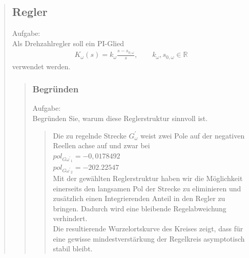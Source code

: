 \begin{quote}
\begin{quote}
        
	\end{quote}
	
	\subsection{Regler}
    Aufgabe:\\
    Als Drehzahlregler soll ein PI-Glied\\
    \begin{equation*}
        \begin{split}
            K_\omega (s) = k_\omega \frac{s-s_{0,\omega}}{s}, \hspace{2em} k_\omega, s_{0,\omega} \in \mathbb{R}
        \end{split}
    \end{equation*}
    verwendet werden.
	\begin{quote}
		
		\subsubsection{Begründen}
        Aufgabe:\\
        Begründen Sie, warum diese Reglerstruktur sinnvoll ist.\\
		\begin{quote}
			Die zu regelnde Strecke $G_\omega^{'}$ weist zwei Pole auf der negativen Reellen achse auf und zwar bei\\
			\vspace{1em}
			$pol_{G\omega^{'}}_1 = - 0,0178492$\\
			\vspace{1em}
			$pol_{G\omega^{'}}_2 = - 202.22547$\\
			\vspace{1em}
			Mit der gewählten Reglerstruktur haben wir die Möglichkeit einerseits den langsamen Pol der Strecke zu eliminieren
			und zusätzlich einen Integrierenden Anteil in den Regler zu bringen. Dadurch wird eine bleibende Regelabweichung
			verhindert.\\
			Die resultierende Wurzelortskurve des Kreises zeigt, dass für eine gewisse mindestverstärkung der Regelkreis
			asymptotisch stabil bleibt.
		\end{quote}
		

\end{quote}
\end{quote}
